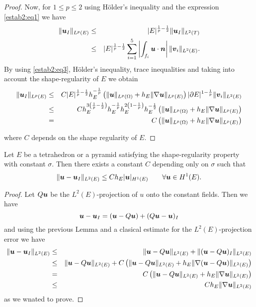 \begin{proof}
Now, for $1\le p\le 2$ using H\"older's inequality and the expression \eqref{estab2:eq1} we have
\begin{eqnarray*}
\|\boldsymbol{u}_I\|_{L^p(E)}&\le& |E|^{\frac1p-\frac12}\|\boldsymbol{u}_I\|_{L^2(T)}\\&\le&|E|^{\frac1p-\frac12} \sum_{i=1}^5  \left|\int_{f_i}\boldsymbol{u}\cdot\boldsymbol{n}\right|\|\boldsymbol{v}_i\|_{L^2(E)}.
\end{eqnarray*}
By using \eqref{estab2:eq3}, H\"older's inequality, trace inequalities and taking into account the shape-regularity of $E$ we obtain
\begin{eqnarray*}
\|\boldsymbol{u}_I\|_{L^p(E)}&\le& C |E|^{\frac1p-\frac12} h_E^{-\frac1p}\left(\|\boldsymbol{u}\|_{L^p(\Omega)}+h_E\|\nabla\boldsymbol{u}\|_{L^p(E)}\right)|\partial E|^{1-\frac1p} \|\boldsymbol{v}_i\|_{L^2(E)}\\&\le& C h_E^{3\left(\frac1p-\frac12\right)}h_E^{-\frac1p}h_E^{2\left(1-\frac1p\right)} h_E^{-\frac12}\left(\|\boldsymbol{u}\|_{L^p(\Omega)}+h_E\|\nabla\boldsymbol{u}\|_{L^p(E)}\right)\\&=& C \left(\|\boldsymbol{u}\|_{L^p(\Omega)}+h_E\|\nabla\boldsymbol{u}\|_{L^p(E)}\right)
\end{eqnarray*}



where $C$ depends on the shape regularity of $E$.
\end{proof}

\begin{proposition}\label{propErrorInterpolacionPiramidesTetraedros}
Let $E$ be a tetrahedron or a pyramid satisfying the shape-regularity property with constant $\sigma$. Then there exists a constant $C$ depending only on $\sigma$ such that 
\[
\|\boldsymbol{u}-\boldsymbol{u}_I\|_{L^2(E)}\le C h_E|\boldsymbol{u}|_{H^1(E)} \qquad \forall \boldsymbol{u}\in H^1(E).
\]
\end{proposition}
\begin{proof} Let $Q\boldsymbol{u}$ be the $L^2(E)$-projection of $u$ onto the constant fields. Then we have
\[
\boldsymbol{u}-\boldsymbol{u}_I = (\boldsymbol{u} - Q\boldsymbol{u}) + (Q\boldsymbol{u}-\boldsymbol{u})_I
\]
and using the previous Lemma and a clasical estimate for the $L^2(E)$-projection error we have
\begin{eqnarray*}
\|\boldsymbol{u}-\boldsymbol{u}_I\|_{L^2(E)} &\le& \|\boldsymbol{u} - Q\boldsymbol{u}\|_{L^2(E)} + \|(\boldsymbol{u}-Q\boldsymbol{u})_I\|_{L^2(E)}\\ &\le& \|\boldsymbol{u} - Q\boldsymbol{u}\|_{L^2(E)} + C \left(\|\boldsymbol{u}-Q\boldsymbol{u}\|_{L^2(E)} + h_E\|\nabla(\boldsymbol{u}-Q\boldsymbol{u})\|_{L^2(E)}\right)\\ &=& C\left(\|\boldsymbol{u}-Q\boldsymbol{u}\|_{L^2(E)} + h_E\|\nabla\boldsymbol{u}\|_{L^2(E)}\right)\\&\le& Ch_E\|\nabla\boldsymbol{u}\|_{L^2(E)}
\end{eqnarray*}
as we wnated to prove.
\end{proof}



